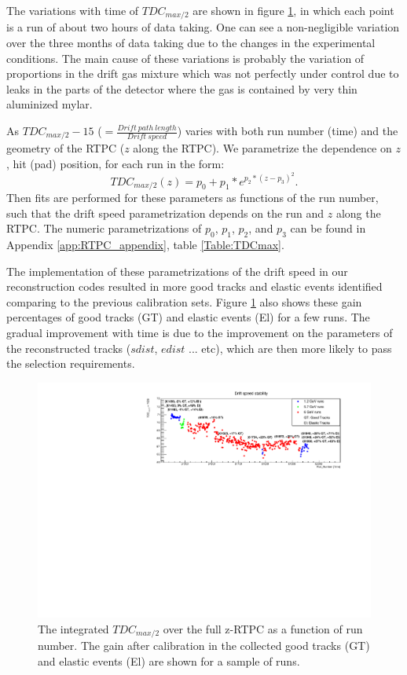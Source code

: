 The variations with time of $TDC_{max/2}$ are shown in figure 
\ref{fig:Drift_run_number}, in which each point is a run of about two hours of 
data taking. One can see a non-negligible variation over the three months of 
data taking due to the changes in the experimental conditions. The main cause 
of these variations is probably the variation of proportions in the drift gas 
mixture which was not perfectly under control due to leaks in the parts of 
the detector where the gas is contained by very thin aluminized mylar.

As $TDC_{max/2} -15 $ ($= \frac{Drift~path~length}{Drift~speed}$) varies with 
both run number (time) and the geometry of the RTPC ($z$ along the RTPC). We
parametrize the dependence on $z$, hit (pad) position, for each run in the 
form:
\begin{equation}
TDC_{max/2} (z)= p_{0} +  p_{1} * e^{p_{2}*(z-p_{3})^{2}}.
\label{equ:drift_speed_fit}
\end{equation}
Then fits are performed for these parameters as functions of the run number, 
such that the drift speed parametrization depends on the run and $z$ along the 
RTPC. The numeric parametrizations of $p_{0}$, $p_{1}$, $p_{2}$, and $p_{3}$ 
can be found in Appendix \ref{app:RTPC_appendix}, table \ref{Table:TDCmax}. 

The implementation of these parametrizations of the drift speed in our 
reconstruction codes resulted in more good tracks and elastic 
events identified comparing to the previous calibration sets. Figure 
\ref{fig:Drift_run_number} also shows these gain percentages of good tracks 
(GT) and elastic events (El) for a few runs. The gradual improvement 
with time is due to the improvement on the parameters of the reconstructed 
tracks ($sdist$, $edist$ ... etc), which are then more likely to pass the 
selection requirements. 

\begin{figure}[tpb]
\hspace{-0.3in}
\includegraphics[scale=0.9]{fig_rtpc/updates/TDCmax2-run-number.pdf}
\caption{ The integrated $TDC_{max/2}$ over the full z-RTPC as a function of 
run number.  The gain after calibration in the collected good tracks (GT) and 
elastic events (El) are shown for a sample of runs.}
\label{fig:Drift_run_number}
\end{figure} 

